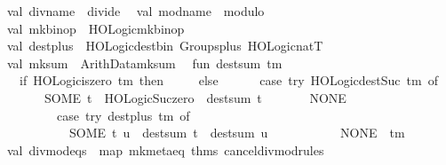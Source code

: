 \begin{isabellebody}
{\isacharparenleft}{\kern0pt}\isanewline
\ \ val\ div{\isacharunderscore}{\kern0pt}name\ {\isacharequal}{\kern0pt}\ \isactrlconstUNDERSCOREname {\isasymopen}divide{\isasymclose}{\isacharsemicolon}{\kern0pt}\isanewline
\ \ val\ mod{\isacharunderscore}{\kern0pt}name\ {\isacharequal}{\kern0pt}\ \isactrlconstUNDERSCOREname {\isasymopen}modulo{\isasymclose}{\isacharsemicolon}{\kern0pt}\isanewline
\ \ val\ mk{\isacharunderscore}{\kern0pt}binop\ {\isacharequal}{\kern0pt}\ HOLogic{\isachardot}{\kern0pt}mk{\isacharunderscore}{\kern0pt}binop{\isacharsemicolon}{\kern0pt}\isanewline
\ \ val\ dest{\isacharunderscore}{\kern0pt}plus\ {\isacharequal}{\kern0pt}\ HOLogic{\isachardot}{\kern0pt}dest{\isacharunderscore}{\kern0pt}bin\ \isactrlconstUNDERSCOREname {\isasymopen}Groups{\isachardot}{\kern0pt}plus{\isasymclose}\ HOLogic{\isachardot}{\kern0pt}natT{\isacharsemicolon}{\kern0pt}\isanewline
\ \ val\ mk{\isacharunderscore}{\kern0pt}sum\ {\isacharequal}{\kern0pt}\ Arith{\isacharunderscore}{\kern0pt}Data{\isachardot}{\kern0pt}mk{\isacharunderscore}{\kern0pt}sum{\isacharsemicolon}{\kern0pt}\isanewline
\ \ fun\ dest{\isacharunderscore}{\kern0pt}sum\ tm\ {\isacharequal}{\kern0pt}\isanewline
\ \ \ \ if\ HOLogic{\isachardot}{\kern0pt}is{\isacharunderscore}{\kern0pt}zero\ tm\ then\ {\isacharbrackleft}{\kern0pt}{\isacharbrackright}{\kern0pt}\isanewline
\ \ \ \ else\isanewline
\ \ \ \ \ \ {\isacharparenleft}{\kern0pt}case\ try\ HOLogic{\isachardot}{\kern0pt}dest{\isacharunderscore}{\kern0pt}Suc\ tm\ of\isanewline
\ \ \ \ \ \ \ \ SOME\ t\ {\isacharequal}{\kern0pt}{\isachargreater}{\kern0pt}\ HOLogic{\isachardot}{\kern0pt}Suc{\isacharunderscore}{\kern0pt}zero\ {\isacharcolon}{\kern0pt}{\isacharcolon}{\kern0pt}\ dest{\isacharunderscore}{\kern0pt}sum\ t\isanewline
\ \ \ \ \ \ {\isacharbar}{\kern0pt}\ NONE\ {\isacharequal}{\kern0pt}{\isachargreater}{\kern0pt}\isanewline
\ \ \ \ \ \ \ \ \ \ {\isacharparenleft}{\kern0pt}case\ try\ dest{\isacharunderscore}{\kern0pt}plus\ tm\ of\isanewline
\ \ \ \ \ \ \ \ \ \ \ \ SOME\ {\isacharparenleft}{\kern0pt}t{\isacharcomma}{\kern0pt}\ u{\isacharparenright}{\kern0pt}\ {\isacharequal}{\kern0pt}{\isachargreater}{\kern0pt}\ dest{\isacharunderscore}{\kern0pt}sum\ t\ {\isacharat}{\kern0pt}\ dest{\isacharunderscore}{\kern0pt}sum\ u\isanewline
\ \ \ \ \ \ \ \ \ \ {\isacharbar}{\kern0pt}\ NONE\ {\isacharequal}{\kern0pt}{\isachargreater}{\kern0pt}\ {\isacharbrackleft}{\kern0pt}tm{\isacharbrackright}{\kern0pt}{\isacharparenright}{\kern0pt}{\isacharparenright}{\kern0pt}{\isacharsemicolon}{\kern0pt}\isanewline
\isanewline
\ \ val\ div{\isacharunderscore}{\kern0pt}mod{\isacharunderscore}{\kern0pt}eqs\ {\isacharequal}{\kern0pt}\ map\ mk{\isacharunderscore}{\kern0pt}meta{\isacharunderscore}{\kern0pt}eq\ {\isacharat}{\kern0pt}{\isacharbraceleft}{\kern0pt}thms\ cancel{\isacharunderscore}{\kern0pt}div{\isacharunderscore}{\kern0pt}mod{\isacharunderscore}{\kern0pt}rules{\isacharbraceright}{\kern0pt}{\isacharsemicolon}{\kern0pt}\isanewline

\end{isabellebody}
